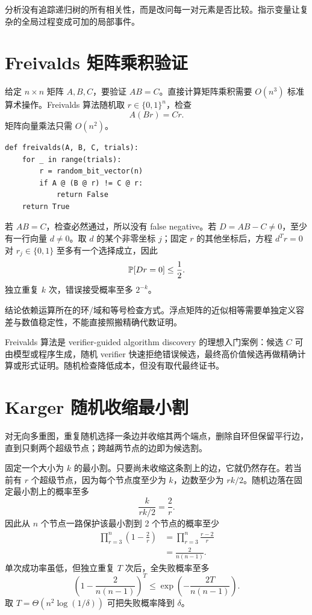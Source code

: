 \begin{intuitionbox}
分析没有追踪递归树的所有相关性，而是改问每一对元素是否比较。指示变量让复杂的全局过程变成可加的局部事件。
\end{intuitionbox}

\section{Freivalds 矩阵乘积验证}

给定 $n\times n$ 矩阵 $A,B,C$，要验证 $AB=C$。直接计算矩阵乘积需要 $O(n^3)$ 标准算术操作。Freivalds 算法随机取 $r\in\{0,1\}^n$，检查
\[
A(Br)=Cr.
\]
矩阵向量乘法只需 $O(n^2)$。

\begin{lstlisting}
def freivalds(A, B, C, trials):
    for _ in range(trials):
        r = random_bit_vector(n)
        if A @ (B @ r) != C @ r:
            return False
    return True
\end{lstlisting}

若 $AB=C$，检查必然通过，所以没有 false negative。若 $D=AB-C\ne0$，至少有一行向量 $d\ne0$。取 $d$ 的某个非零坐标 $j$；固定 $r$ 的其他坐标后，方程 $d^Tr=0$ 对 $r_j\in\{0,1\}$ 至多有一个选择成立，因此
\[
\mathbb{P}[Dr=0]\le\frac12.
\]
独立重复 $k$ 次，错误接受概率至多 $2^{-k}$。

\begin{warningbox}
结论依赖运算所在的环/域和等号检查方式。浮点矩阵的近似相等需要单独定义容差与数值稳定性，不能直接照搬精确代数证明。
\end{warningbox}

\begin{aibox}
Freivalds 算法是 verifier-guided algorithm discovery 的理想入门案例：候选 $C$ 可由模型或程序生成，随机 verifier 快速拒绝错误候选，最终高价值候选再做精确计算或形式证明。随机检查降低成本，但没有取代最终证书。
\end{aibox}

\section{Karger 随机收缩最小割}

对无向多重图，重复随机选择一条边并收缩其两个端点，删除自环但保留平行边，直到只剩两个超级节点；跨越两节点的边即为候选割。

固定一个大小为 $k$ 的最小割。只要尚未收缩这条割上的边，它就仍然存在。若当前有 $r$ 个超级节点，因为每个节点度至少为 $k$，边数至少为 $rk/2$。随机边落在固定最小割上的概率至多
\[
\frac{k}{rk/2}=\frac2r.
\]
因此从 $n$ 个节点一路保护该最小割到 2 个节点的概率至少
\begin{align*}
\prod_{r=3}^{n}\left(1-\frac2r\right)
&=\prod_{r=3}^{n}\frac{r-2}{r}\\
&=\frac{2}{n(n-1)}.
\end{align*}
单次成功率虽低，但独立重复 $T$ 次后，全失败概率至多
\[
\left(1-\frac{2}{n(n-1)}\right)^T
\le\exp\left(-\frac{2T}{n(n-1)}\right).
\]
取 $T=\Theta(n^2\log(1/\delta))$ 可把失败概率降到 $\delta$。

